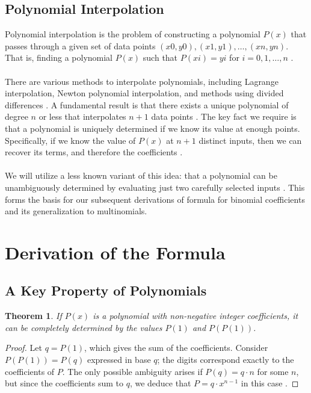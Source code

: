 \documentclass{article}
\theoremstyle{plain}
\newtheorem{thm}{Theorem}
\begin{document}
\subsection{Polynomial Interpolation}
Polynomial interpolation is the problem of constructing a polynomial $P(x)$ that passes through a given set of data points ${(x0, y0), (x1, y1), \ldots, (xn, yn)}$. That is, finding a polynomial $P(x)$ such that $P(xi) = yi$ for $i = 0, 1, \ldots, n$ \cite{burden2011numerical, kincaid2012numerical}.
\\
\\
There are various methods to interpolate polynomials, including Lagrange interpolation, Newton polynomial interpolation, and methods using divided differences \cite{burden2011numerical, kincaid2012numerical}. A fundamental result is that there exists a unique polynomial of degree \( n \) or less that interpolates \( n+1 \) data points \cite{burden2011numerical}. The key fact we require is that a polynomial is uniquely determined if we know its value at enough points. Specifically, if we know the value of \( P(x) \) at \( n+1 \) distinct inputs, then we can recover its terms, and therefore the coefficients \cite{cheney2013course}.
\\
\\
We will utilize a less known variant of this idea: that a polynomial can be unambiguously determined by evaluating just two carefully selected inputs \cite{arupinski,jcook}. This forms the basis for our subsequent derivations of formula for binomial coefficients and its generalization to multinomials.

\section{Derivation of the Formula}

\subsection{A Key Property of Polynomials}

\begin{thm}
\label{thm:1}
If $P(x)$ is a polynomial with non-negative integer coefficients, it can be completely determined by the values $P(1)$ and $P(P(1))$.
\end{thm}

\begin{proof}
Let $q = P(1)$, which gives the sum of the coefficients. Consider $P(P(1)) = P(q)$ expressed in base $q$; the digits correspond exactly to the coefficients of $P$. The only possible ambiguity arises if $P(q) = q\cdot n$ for some $n$, but since the coefficients sum to $q$, we deduce that $P = q \cdot x^{n-1}$ in this case \cite{arupinski}.
\end{proof}
\end{document}
